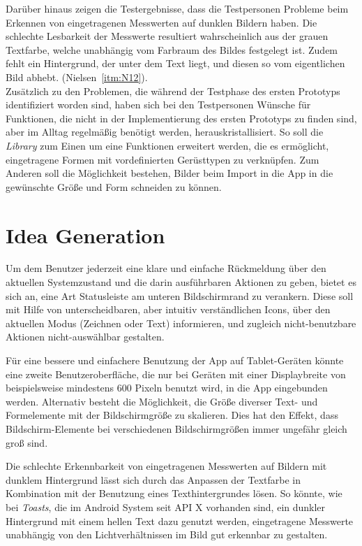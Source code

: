 Darüber hinaus zeigen die Testergebnisse, dass die Testpersonen Probleme beim Erkennen von eingetragenen Messwerten auf dunklen Bildern haben.
Die schlechte Lesbarkeit der Messwerte resultiert wahrscheinlich aus der grauen Textfarbe, welche unabhängig vom Farbraum des Bildes festgelegt ist.
Zudem fehlt ein Hintergrund, der unter dem Text liegt, und diesen so vom eigentlichen Bild abhebt.
(Nielsen~\autoref{itm:N12}). \\

Zusätzlich zu den Problemen, die während der Testphase des ersten Prototyps identifiziert worden sind, haben sich bei den Testpersonen Wünsche für Funktionen, die nicht in der Implementierung des ersten Prototyps zu finden sind, aber im Alltag regelmäßig benötigt werden, herauskristallisiert. 
So soll die \emph{Library} zum Einen um eine Funktionen erweitert werden, die es ermöglicht, eingetragene Formen mit vordefinierten Gerüsttypen zu verknüpfen.
Zum Anderen soll die Möglichkeit bestehen, Bilder beim Import in die App in die gewünschte Größe und Form schneiden zu können.

\section{Idea Generation}\label{sec:idea2}
Um dem Benutzer jederzeit eine klare und einfache Rückmeldung über den aktuellen Systemzustand und die darin ausführbaren Aktionen zu geben, bietet es sich an, eine Art Statusleiste am unteren Bildschirmrand zu verankern.
Diese soll mit Hilfe von unterscheidbaren, aber intuitiv verständlichen Icons, über den aktuellen Modus (Zeichnen oder Text) informieren, und zugleich nicht-benutzbare Aktionen nicht-auswählbar gestalten. \\

Für eine bessere und einfachere Benutzung der App auf Tablet-Geräten könnte eine zweite Benutzeroberfläche, die nur bei Geräten mit einer Displaybreite von beispielsweise mindestens $600$ Pixeln benutzt wird, in die App eingebunden werden. 
Alternativ besteht die Möglichkeit, die Größe diverser Text- und Formelemente mit der Bildschirmgröße zu skalieren.
Dies hat den Effekt, dass Bildschirm-Elemente bei verschiedenen Bildschirmgrößen immer ungefähr gleich groß sind.
\\

Die schlechte Erkennbarkeit von eingetragenen Messwerten auf Bildern mit dunklem Hintergrund lässt sich durch das Anpassen der Textfarbe in Kombination mit der Benutzung eines Texthintergrundes lösen.
So könnte, wie bei \emph{Toasts}, die im Android System seit API X vorhanden sind, ein dunkler Hintergrund mit einem hellen Text dazu genutzt werden, eingetragene Messwerte unabhängig von den Lichtverhältnissen im Bild gut erkennbar zu gestalten. \\


